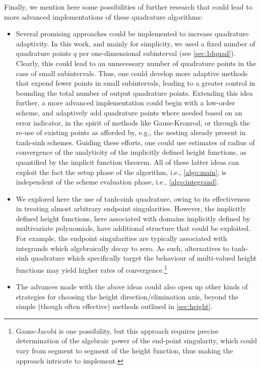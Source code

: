 \documentclass[onefignum,onetabnum,onealgnum,oneeqnum]{siamart190516}
\begin{document}
Finally, we mention here some possibilities of further research that could lead to more advanced implementations of these quadrature algorithms:
\begin{itemize}
\item Several promising approaches could be implemented to increase quadrature adaptivity. In this work, and mainly for simplicity, we used a fixed number of quadrature points $q$ per one-dimensional subinterval (see \cref{sec:1dquad}). Clearly, this could lead to an unnecessary number of quadrature points in the case of small subintervals. Thus, one could develop more adaptive methods that expend fewer points in small subintervals, leading to a greater control in bounding the total number of output quadrature points. Extending this idea further, a more advanced implementation could begin with a low-order scheme, and adaptively add quadrature points where needed based on an error indicator, in the spirit of methods like Gauss-Kronrod, or through the re-use of existing points as afforded by, e.g., the nesting already present in tanh-sinh schemes. Guiding these efforts, one could use estimates of radius of convergence of the analyticity of the implicitly defined height functions, as quantified by the implicit function theorem. All of these latter ideas can exploit the fact the setup phase of the algorithm, i.e., \cref{algo:main}, is independent of the scheme evaluation phase, i.e., \cref{algo:integrand}.
\item We explored here the use of tanh-sinh quadrature, owing to its effectiveness in treating almost arbitrary endpoint singularities. However, the implicitly defined height functions, here associated with domains implicitly defined by multivariate polynomials, have additional structure that could be exploited. For example, the endpoint singularities are typically associated with integrands which algebraically decay to zero. As such, alternatives to tanh-sinh quadrature which specifically target the behaviour of multi-valued height functions may yield higher rates of convergence.\footnote{Gauss-Jacobi is one possibility, but this approach requires precise determination of the algebraic power of the end-point singularity, which could vary from segment to segment of the height function, thus making the approach intricate to implement.}
\item The advances made with the above ideas could also open up other kinds of strategies for choosing the height direction/elimination axis, beyond the simple (though often effective) methods outlined in \cref{sec:height}.

\end{itemize}
\end{document}
